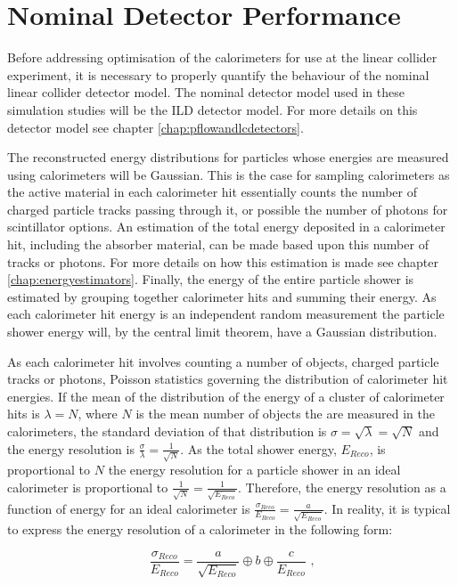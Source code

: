 \section{Nominal Detector Performance}
\label{sec:nominaldetectorperformance}
Before addressing optimisation of the calorimeters for use at the linear collider experiment, it is necessary to properly quantify the behaviour of the nominal linear collider detector model.  The nominal detector model used in these simulation studies will be the ILD detector model.  For more details on this detector model see chapter \ref{chap:pflowandlcdetectors}.  

The reconstructed energy distributions for particles whose energies are measured using calorimeters will be Gaussian.  This is the case for sampling calorimeters as the active material in each calorimeter hit essentially counts the number of charged particle tracks passing through it, or possible the number of photons for scintillator options.  An estimation of the total energy deposited in a calorimeter hit, including the absorber material, can be made based upon this number of tracks or photons.  For more details on how this estimation is made see chapter \ref{chap:energyestimators}.  Finally, the energy of the entire particle shower is estimated by grouping together calorimeter hits and summing their energy.  As each calorimeter hit energy is an independent random measurement the particle shower energy will, by the central limit theorem, have a Gaussian distribution.  

As each calorimeter hit involves counting a number of objects, charged particle tracks or photons, Poisson statistics governing the distribution of calorimeter hit energies.  If the mean of the distribution of the energy of a cluster of calorimeter hits is $\lambda = N$, where $N$ is the mean number of objects the are measured in the calorimeters, the standard deviation of that distribution is $\sigma = \sqrt{\lambda} = \sqrt{N}$ and the energy resolution is $\frac{\sigma}{\lambda} = \frac{1}{\sqrt{N}}$.  As the total shower energy, $E_{Reco}$, is proportional to $N$ the energy resolution for a particle shower in an ideal calorimeter is proportional to $\frac{1}{\sqrt{N}} = \frac{1}{\sqrt{E_{Reco}}}$.  Therefore, the energy resolution as a function of energy for an ideal calorimeter is $\frac{\sigma_{Reco}}{E_{Reco}} = \frac{a}{\sqrt{E_{Reco}}}$.  In reality, it is typical to express the energy resolution of a calorimeter in the following form:

\begin{equation} 
\frac{\sigma_{Reco}}{E_{Reco}} = \frac{a}{\sqrt{E_{Reco}}} \oplus b \oplus \frac{c}{E_{Reco}}\text{ ,}
\end{equation}

